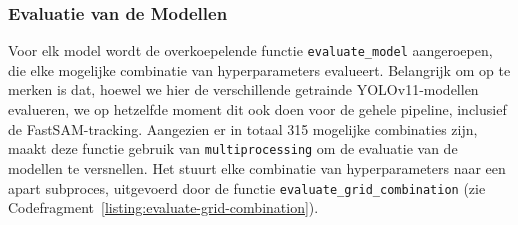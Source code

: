 \subsubsection{Evaluatie van de Modellen}

Voor elk model wordt de overkoepelende functie \texttt{evaluate\_model} aangeroepen,
die elke mogelijke combinatie van hyperparameters evalueert.
Belangrijk om op te merken is dat, hoewel we hier de verschillende getrainde YOLOv11-modellen evalueren,
we op hetzelfde moment dit ook doen voor de gehele pipeline, inclusief de FastSAM-tracking.
Aangezien er in totaal 315 mogelijke combinaties zijn, 
maakt deze functie gebruik van \texttt{multiprocessing} om de evaluatie van de modellen te versnellen.
Het stuurt elke combinatie van hyperparameters naar een apart subproces,
uitgevoerd door de functie \texttt{evaluate\_grid\_combination} (zie Codefragment~\ref{listing:evaluate-grid-combination}).

